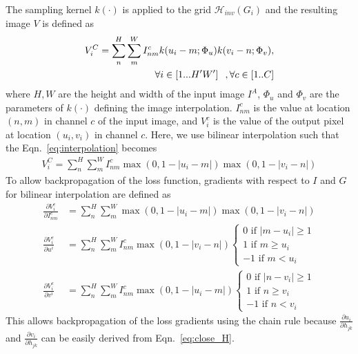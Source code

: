 \documentclass[letterpaper, 10 pt, conference]{ieeeconf}
\begin{document}
The sampling kernel $k(\cdot)$ is applied to the grid $\mathcal{H}_{inv} (G_i)$ and the resulting image $V$ is defined as
\begin{align}
V^C_i = \sum_n^H \sum_m^W I^c_{nm} k (u_i - m; \Phi_u) k(v_i-n; \Phi_v), \nonumber \\ \forall i \in [1...H'W'] \hspace{.1in}, \forall c \in [1..C]
\label{eq:interpolation}
\end{align}
where $H, W$ are the height and width of the input image $I^{A}$, $\Phi_u$ and $\Phi_v$ are the parameters of $k(\cdot)$ defining the image interpolation. $I^c_{nm}$ is the value at location $(n,m)$ in channel $c$ of the input image, and $V^c_i$ is the value of the output pixel at location $(u_i,v_i)$ in channel $c$. Here, we use bilinear interpolation such that the Eqn.~\eqref{eq:interpolation} becomes 
\begin{align}
V^C_i = \sum_n^H \sum_m^W I^c_{nm}  \max(0, 1 - |u_i - m|) \max (0, 1 - |v_i-n|)
\label{eq:bilinear}
\end{align}
To allow backpropagation of the loss function, gradients with respect to $I$ and $G$ for bilinear interpolation are defined as 
\begin{align}
	\frac{\partial V^c_i}{\partial I^c_{nm}} & = \sum_n^H \sum_m^W   \max(0, 1 - |u_i - m|) \max (0, 1 - |v_i-n|) \\ 
    \frac{\partial V^c_i}{\partial u^i} & = \sum_n^H \sum_m^W I^c_{nm} \max (0, 1 - |v_i-n|)         \left\{
                \begin{array}{ll}
                  0   \mbox{ if } |m - u_i| \geq 1   \\
                  1    \mbox{ if } m \geq u_i \\
                  - 1   \mbox{ if } m < u_i
                \end{array}
              \right. \\ 
   \frac{\partial V^c_i}{\partial v^i} & = \sum_n^H \sum_m^W I^c_{nm} \max (0, 1 - |u_i-m|)         \left\{
                \begin{array}{ll}
                  0   \mbox{ if } |n - v_i| \geq 1   \\
                  1    \mbox{ if } n \geq v_i \\
                  - 1   \mbox{ if } n < v_i
                \end{array}
              \right.
\end{align}
This allows backpropagation of the loss gradients using the chain rule because $\frac{\partial u_i}{\partial h_{jk}}$ and $\frac{\partial v_i}{\partial h_{jk}}$ can be easily derived from Eqn.~\ref{eq:close_H}. 
\end{document}
